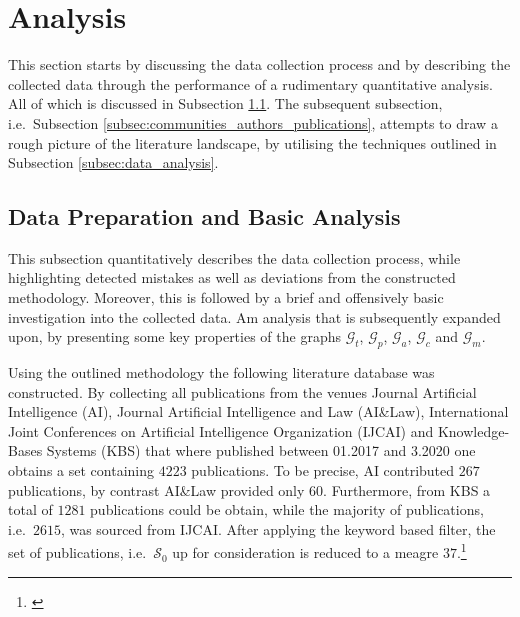 \documentclass[11pt,a4paper]{book}
\theoremstyle{definition}
\theoremstyle{definition}
\theoremstyle{definition}
\theoremstyle{remark}
\newcommand{\xsetz}{\mathcal{S}_{\mathit{0}}}
\newcommand{\tgraph}{\mathcal{G}_{t}}
\newcommand{\pgraph}{\mathcal{G}_{p}}
\newcommand{\agraph}{\mathcal{G}_{a}}
\newcommand{\cgraph}{\mathcal{G}_{c}}
\newcommand{\acgraph}{\mathcal{G}_{m}}
\begin{document}
\section{Analysis}
\label{sec:results}
This section starts by discussing the data collection process and by describing the collected data through the performance of a rudimentary quantitative analysis. All of which is discussed in Subsection \ref{subsec:basic_data_analysis}. 
The subsequent subsection, i.e.\ Subsection \ref{subsec:communities_authors_publications}, attempts to draw a rough picture of the literature landscape, by utilising the techniques outlined in Subsection \ref{subsec:data_analysis}. 



\subsection{Data Preparation and Basic Analysis}
\label{subsec:basic_data_analysis}
This subsection quantitatively describes the data collection process, while highlighting detected mistakes as well as deviations from the constructed methodology.    
Moreover, this is followed by a brief and offensively basic investigation into the collected data. Am analysis that is subsequently expanded upon, by presenting some key properties of the graphs $\tgraph$, $\pgraph$, $\agraph$, $\cgraph$ and $\acgraph$.



Using the outlined methodology the following literature database was constructed. 
By collecting all publications from the venues
Journal Artificial Intelligence (AI), Journal Artificial Intelligence and Law (AI\&Law), International Joint Conferences on Artificial Intelligence Organization (IJCAI) and Knowledge-Bases Systems (KBS) that where published between 01.2017 and 3.2020 one obtains a set containing $4223$ publications. To be precise, AI contributed $267$ publications, by contrast  AI\&Law provided only $60$. Furthermore, from KBS a total of $1281$ publications could be obtain, while the majority of publications, i.e.\ $2615$, was sourced from IJCAI.
After applying the keyword based filter, the set of publications, i.e.\ $\xsetz$ up for consideration is reduced to a meagre $37$.\footnote{\parencite{van2019separators,verheij2017proof,chen2019judicial,neil2019modelling,li2019context,lu2018mining,zhang2018collective,
constantinou2017towards,liang2017evaluation,zhang2017characterizing,mu2018measuring,kronegger2019backdoors,hyttinen2017core,
zhang2017transfer,zhang2017causal,liu2017cause,summerville2017charda,zhang2016causal,albrecht2016exploiting,chai2018language,
bochman2018actual,ibeling2018conditional,laurent2018counterfactual,chikahara2018causal,zhang2017achieving,backstrom2018novel,
jaber2018graphical,sridhar2018scalable,wenjuan2018mixed,xu2019achieving,zhang2019asp,Cai2019CausalDW,Sridhar2019EstimatingCE,
xie2019boosting,hassanzadeh2019answering,shankar2019three,Liepina2019ArguingAC}}
\end{document}
